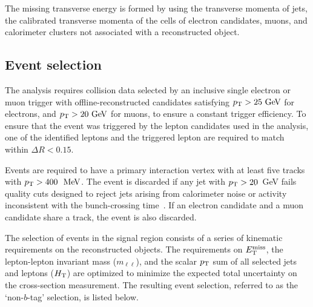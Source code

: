 The missing transverse energy is formed by using the transverse 
momenta of jets, the calibrated transverse momenta of the cells of electron
candidates, muons, and calorimeter clusters not associated with a
reconstructed object.




%
%

\subsection{Event selection}
\label{s:event}

The analysis requires collision data selected by an inclusive single
electron or muon trigger with offline-reconstructed
candidates satisfying $\pt>25\GeV$ for electrons, and $\pt>20\GeV$ for muons, to ensure a constant trigger efficiency.
To ensure that the event was triggered by the lepton candidates used
in the analysis,  one of the identified leptons and the triggered
lepton are required to match within $\Delta R < 0.15$.

Events are required to have a primary interaction vertex with at
least five tracks with $\pt>400~\MeV$.  The event is discarded if
any jet with $p_{\mathrm{T}}>20$~GeV fails quality cuts designed to reject jets
arising from calorimeter noise or activity inconsistent with the
bunch-crossing time~\cite{jetcor}. If an electron candidate and a
muon candidate share a track, the event is also discarded.

The selection of events in the signal region consists of a series of kinematic requirements on
the reconstructed objects.
The requirements on $E_{\mathrm{T}}^{\mathrm{miss}}$, the lepton-lepton invariant
mass ($m_{\ell\ell}$), and the scalar $p_{\mathrm{T}}$ sum of all selected jets and leptons ($H_{\mathrm{T}}$) are optimized
to minimize the expected total uncertainty on the cross-section measurement.
The resulting event selection, referred to as the `non-$b$-tag' selection, is listed below.


